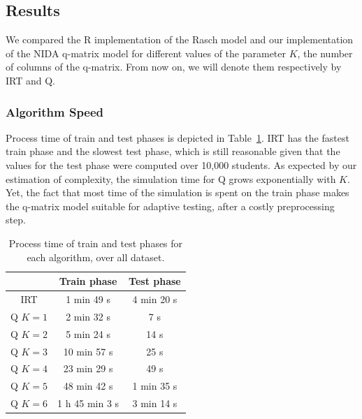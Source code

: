 \documentclass{edm_template}
\begin{document}
\subsection{Results}

We compared the R implementation of the Rasch model and our implementation of the NIDA q-matrix model for different values of the parameter $K$, the number of columns of the q-matrix. From now on, we will denote them respectively by IRT and Q.

\subsubsection{Algorithm Speed}

Process time of train and test phases is depicted in Table~\ref{tab:time}. IRT has the fastest train phase and the slowest test phase, which is still reasonable given that the values for the test phase were computed over 10,000 students. As expected by our estimation of complexity, the simulation time for Q grows exponentially with $K$. Yet, the fact that most time of the simulation is spent on the train phase makes the q-matrix model suitable for adaptive testing, after a costly preprocessing step.

\begin{table}[H]
\centering\begin{tabular}{@{}c|cc@{}}
& Train phase & Test phase\\
\hline
IRT & 1 min 49 s & 4 min 20 s\\%
Q $K = 1$ & 2 min 32 s & 7 s\\
Q $K = 2$ & 5 min 24 s & 14 s\\
Q $K = 3$ & 10 min 57 s & 25 s\\ %
Q $K = 4$ & 23 min 29 s & 49 s\\ %
Q $K = 5$ & 48 min 42 s & 1 min 35 s\\ %
Q $K = 6$ & 1 h 45 min 3 s & 3 min 14 s %
\end{tabular}
\caption{Process time of train and test phases for each algorithm, over all dataset.}
\label{tab:time}
\end{table}
\end{document}
